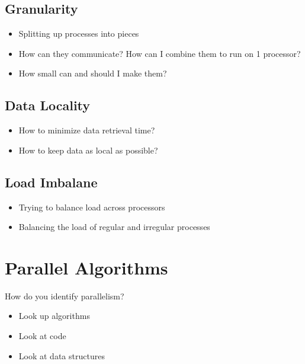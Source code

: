 \documentclass[a4paper]{article}
\begin{document}
\subsection{Granularity}
\begin{itemize}
\setlength{\itemsep}{-4pt}
\item Splitting up processes into pieces
\item How can they communicate? How can I combine them to run on 1 processor?
\item How small can and should I make them?
\end{itemize}

\subsection{Data Locality}
\begin{itemize}
\setlength{\itemsep}{-4pt}
\item How to minimize data retrieval time?
\item How to keep data as local as possible?
\end{itemize}

\subsection{Load Imbalane}
\begin{itemize}
\setlength{\itemsep}{-4pt}
\item Trying to balance load across processors
\item Balancing the load of regular and irregular processes
\end{itemize}

\section{Parallel Algorithms}
How do you identify parallelism?\\
\begin{itemize}
\setlength{\itemsep}{-4pt}
\item Look up algorithms
\item Look at code
\item Look at data structures
\end{itemize}
\end{document}
